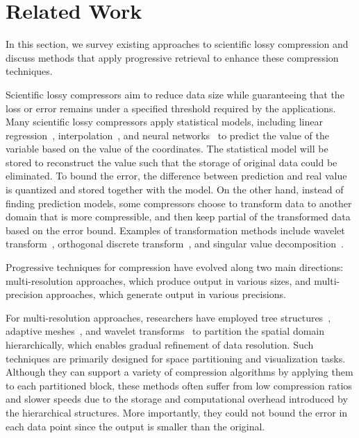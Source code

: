 


\section{Related Work}
\label{sec:related}
In this section, we survey existing approaches to scientific lossy compression and discuss methods that apply progressive retrieval to enhance these compression techniques.

Scientific lossy compressors aim to reduce data size while guaranteeing that the loss or error remains under a specified threshold required by the applications. 
Many scientific lossy compressors apply statistical models, including linear regression~\cite{sz17}, interpolation~\cite{interp, qoz, qoz2}, and neural networks~\cite{coordnet, aesz, srnnsz} to predict the value of the variable based on the value of the coordinates. The statistical model will be stored to reconstruct the value such that the storage of original data could be eliminated. To bound the error, the difference between prediction and real value is quantized and stored together with the model. 
On the other hand, instead of finding prediction models, some compressors choose to transform data to another domain that is more compressible, and then keep partial of the transformed data based on the error bound. Examples of transformation methods include wavelet transform~\cite{sperr}, orthogonal discrete transform~\cite{zfp}, and singular value decomposition~\cite{tthresh}. 

Progressive techniques for compression have evolved along two main directions: multi-resolution approaches, which produce output in various sizes, and multi-precision approaches, which generate output in various precisions.

For multi-resolution approaches, researchers have employed tree structures~\cite{zfp-particle2, precision-resolution-tree}, adaptive meshes~\cite{peter-mesh-tvcg22}, and wavelet transforms~\cite{li2019vapor} to partition the spatial domain hierarchically, which enables gradual refinement of data resolution. Such techniques are primarily designed for space partitioning and visualization tasks. 
Although they can support a variety of compression algorithms by applying them to each partitioned block, these methods often suffer from low compression ratios and slower speeds due to the storage and computational overhead introduced by the hierarchical structures. More importantly, they could not bound the error in each data point since the output is smaller than the original.

